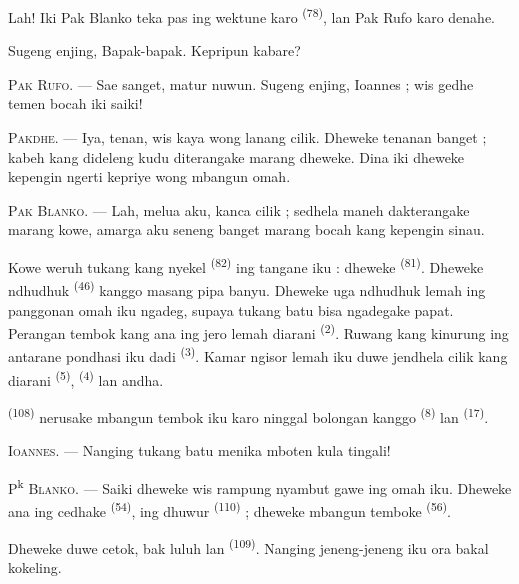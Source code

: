 Lah! Iki Pak Blanko teka pas ing wektune karo 
\textsuperscript{(78)}, lan Pak Rufo karo denahe.

Sugeng enjing, Bapak-bapak. Kepripun kabare?

\textsc{Pak Rufo}. --- Sae sanget, matur nuwun. Sugeng enjing,
Ioannes ; wis gedhe temen bocah iki saiki!

\textsc{Pakdhe}. --- Iya, tenan, wis kaya wong lanang cilik. Dheweke
tenanan banget ; kabeh kang dideleng kudu diterangake marang dheweke.
Dina iki dheweke kepengin ngerti kepriye wong mbangun omah.

\VUsaut{3.0mm}

\textsc{Pak Blanko}. --- Lah, melua aku, kanca cilik ; sedhela maneh
dakterangake marang kowe, amarga aku seneng banget marang bocah kang
kepengin sinau.

Kowe weruh tukang kang nyekel  \textsuperscript{(82)} ing
tangane iku : dheweke  \textsuperscript{(81)}.
Dheweke ndhudhuk  \textsuperscript{(46)} kanggo masang pipa
banyu. Dheweke uga ndhudhuk lemah ing panggonan omah iku ngadeg,
supaya tukang batu bisa ngadegake  papat. Perangan
tembok kang ana ing jero lemah diarani 
\textsuperscript{(2)}. Ruwang kang kinurung ing antarane pondhasi iku
dadi  \textsuperscript{(3)}. Kamar ngisor
lemah iku duwe jendhela cilik kang diarani  \textsuperscript{(5)}, 
\textsuperscript{(4)} lan andha.

 \textsuperscript{(108)} nerusake mbangun tembok iku
karo ninggal bolongan kanggo  \textsuperscript{(8)} lan
 \textsuperscript{(17)}.

\textsc{Ioannes}. --- Nanging tukang batu menika mboten kula tingali!

P\textsuperscript{k} \textsc{Blanko}. --- Saiki dheweke wis rampung
nyambut gawe ing omah iku. Dheweke ana ing cedhake  \textsuperscript{(54)}, ing dhuwur 
\textsuperscript{(110)} ; dheweke mbangun temboke  \textsuperscript{(56)}.

Dheweke duwe cetok, bak luluh lan 
\textsuperscript{(109)}. Nanging jeneng-jeneng iku ora bakal kokeling.

